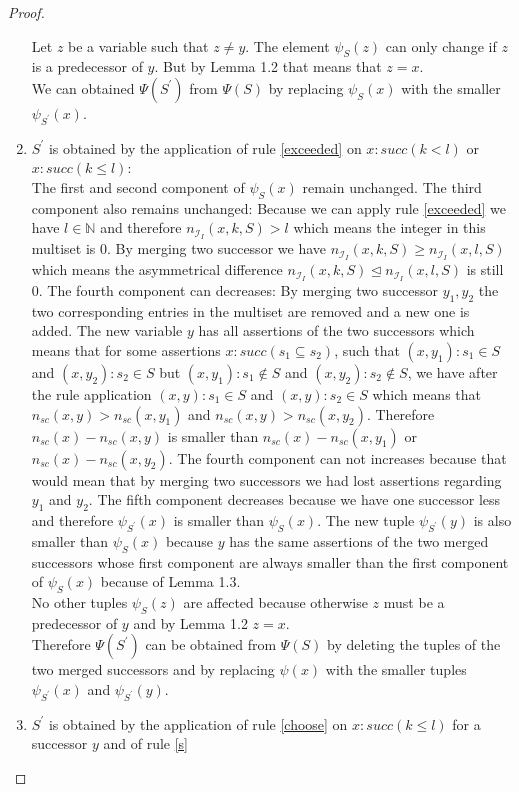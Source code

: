 \documentclass[a4paper,11pt]{scrartcl}
\theoremstyle{break}
\theoremstyle{definition}
\begin{document}
\begin{proof}
\begin{enumerate}
Let $z$ be a variable such that $z\neq y$. The element $\psi_S(z)$ can only change if $z$ is a predecessor of $y$. But by Lemma 1.2 that means that $z=x$.\\
We can obtained $\Psi(S^\prime)$ from $\Psi(S)$ by replacing $\psi_S(x)$ with the smaller $\psi_{S^\prime}(x)$.
\item $S^\prime$ is obtained by the application of rule \ref{exceeded} on $x:succ(k<l)$ or $x:succ(k\leq l)$:\\
The first and second component of $\psi_S(x)$ remain unchanged. The third component also remains unchanged: Because we can apply rule \ref{exceeded} we have $l\in\mathbb{N}$ and therefore $n_{\mathcal{I}_I}(x,k,S)>l$ which means the integer in this multiset is $0$. By merging two successor we have $n_{\mathcal{I}_I}(x,k,S)\geq n_{\mathcal{I}_I}(x,l,S)$ which means the asymmetrical difference $n_{\mathcal{I}_I}(x,k,S)\unlhd  n_{\mathcal{I}_I}(x,l,S)$ is still $0$. The fourth component can decreases: By merging two successor $y_1, y_2$ the two corresponding entries in the multiset are removed and a new one is added. The new variable $y$ has all assertions of the two successors which means that for some assertions $x:succ(s_1\subseteq s_2)$, such that $(x,y_1):s_1\in S$ and $(x,y_2):s_2\in S$ but $(x,y_1):s_1\not\in S$ and $(x,y_2):s_2\not\in S$, we have after the rule application $(x,y):s_1\in S$ and $(x,y):s_2\in S$ which means that $n_{sc}(x,y)>n_{sc}(x,y_1)$ and $n_{sc}(x,y)>n_{sc}(x,y_2)$. Therefore $n_{sc}(x)-n_{sc}(x,y)$ is smaller than $n_{sc}(x)-n_{sc}(x,y_1)$ or $n_{sc}(x)-n_{sc}(x,y_2)$. The fourth component can not increases because that would mean that by merging two successors we had lost assertions regarding $y_1$ and $y_2$. The fifth component decreases because we have one successor less and therefore $\psi_{S^\prime}(x)$ is smaller than $\psi_S(x)$. The new tuple $\psi_{S^\prime}(y)$ is also smaller than $\psi_S(x)$ because $y$ has the same assertions of the two merged successors whose first component are always smaller than the first component of $\psi_S(x)$ because of Lemma 1.3.\\
No other tuples $\psi_S(z)$ are affected because otherwise $z$ must be a predecessor of $y$ and by Lemma 1.2 $z=x$.\\
Therefore $\Psi(S^\prime)$ can be obtained from $\Psi(S)$ by deleting the tuples of the two merged successors and by replacing $\psi(x)$ with the smaller tuples $\psi_{S^\prime}(x)$ and $\psi_{S^\prime}(y)$.
\item $S^\prime$ is obtained by the application of rule \ref{choose} on $x:succ(k\leq l)$ for a successor $y$ and of rule \ref{s}\\

\end{enumerate}
\end{proof}
\end{document}
